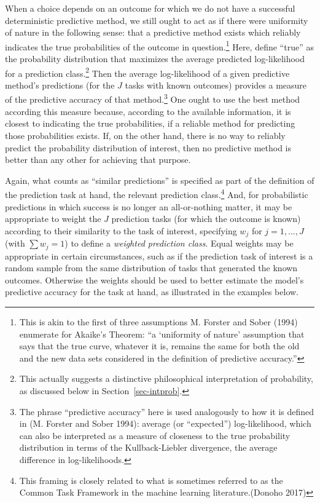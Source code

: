 \documentclass[
  letterpaper,
  DIV=11,
  numbers=noendperiod]{scrartcl}
\theoremstyle{definition}
\theoremstyle{remark}
\begin{document}
When a choice depends on an outcome for which we do not have a
successful deterministic predictive method, we still ought to act as if
there were uniformity of nature in the following sense: that a
predictive method exists which reliably indicates the true probabilities
of the outcome in question.\footnote{This is akin to the first of three
  assumptions M. Forster and Sober (1994) enumerate for Akaike's
  Theorem: ``a `uniformity of nature' assumption that says that the true
  curve, whatever it is, remains the same for both the old and the new
  data sets considered in the definition of predictive accuracy.''}
Here, define ``true'' as the probability distribution that maximizes the
average predicted log-likelihood for a prediction class.\footnote{This
  actually suggests a distinctive philosophical interpretation of
  probability, as discussed below in Section~\ref{sec-intprob}.} Then
the average log-likelihood of a given predictive method's predictions
(for the \(J\) tasks with known outcomes) provides a measure of the
predictive accuracy of that method.\footnote{The phrase ``predictive
  accuracy'' here is used analogously to how it is defined in (M.
  Forster and Sober 1994): average (or ``expected'') log-likelihood,
  which can also be interpreted as a measure of closeness to the true
  probability distribution in terms of the Kullback-Liebler divergence,
  the average difference in log-likelihoods.} One ought to use the best
method according this measure because, according to the available
information, it is closest to indicating the true probabilities, if a
reliable method for predicting those probabilities exists. If, on the
other hand, there is no way to reliably predict the probability
distribution of interest, then no predictive method is better than any
other for achieving that purpose.

Again, what counts as ``similar predictions'' is specified as part of
the definition of the prediction task at hand, the relevant prediction
class.\footnote{This framing is closely related to what is sometimes
  referred to as the Common Task Framework in the machine learning
  literature.(Donoho 2017)} And, for probabilistic predictions in which
success is no longer an all-or-nothing matter, it may be appropriate to
weight the \(J\) prediction tasks (for which the outcome is known)
according to their similarity to the task of interest, specifying
\(w_j\) for \(j=1, ..., J\) (with \(\sum w_j = 1\)) to define a
\emph{weighted prediction class}. Equal weights may be appropriate in
certain circumstances, such as if the prediction task of interest is a
random sample from the same distribution of tasks that generated the
known outcomes. Otherwise the weights should be used to better estimate
the model's predictive accuracy for the task at hand, as illustrated in
the examples below.
\end{document}
